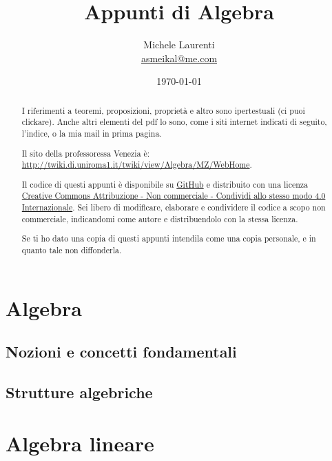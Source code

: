 \documentclass[11pt,a4paper,twoside,draft]{report}
\theoremstyle{plain}%
\theoremstyle{definition}
\theoremstyle{remark}
\begin{document}
\title{Appunti di Algebra}
\author{Michele Laurenti \\ \href{mailto:asmeikal@me.com}{asmeikal@me.com}}
\date{\today}

\maketitle

\newpage

\tableofcontents

\newpage

\begin{abstract}
I riferimenti a teoremi, proposizioni, propriet\`a e altro sono ipertestuali (ci puoi clickare). Anche altri elementi del pdf lo sono, come i siti internet indicati di seguito, l'indice, o la mia mail in prima pagina.

Il sito della professoressa Venezia \`e: \url{http://twiki.di.uniroma1.it/twiki/view/Algebra/MZ/WebHome}.

Il codice di questi appunti \`e disponibile su \href{https://github.com/asmeikal/Appunti-Algebra-2014}{GitHub} e distribuito con una licenza \href{http://creativecommons.org/licenses/by-nc-sa/4.0/deed.it}{Creative Commons Attribuzione - Non commerciale - Condividi allo stesso modo 4.0 Internazionale}. Sei libero di modificare, elaborare e condividere il codice a scopo non commerciale, indicandomi come autore e distribuendolo con la stessa licenza.

Se ti ho dato una copia di questi appunti intendila come una copia personale, e in quanto tale non diffonderla.
\end{abstract}

\part{Algebra}

\chapter{Nozioni e concetti fondamentali}



\chapter{Strutture algebriche}



\part{Algebra lineare}
\end{document}
